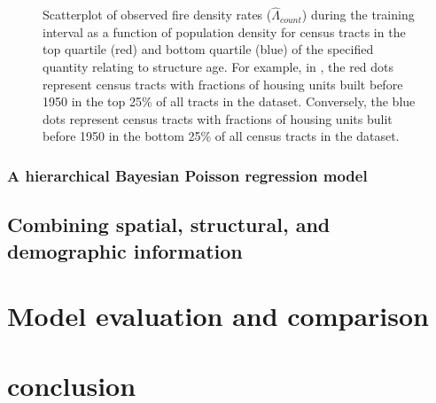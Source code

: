 \documentclass{svjour3}
\begin{document}
\begin{figure}[!htb]
\begin{center}
{          } %
      \end{center}
      \caption{Scatterplot of observed fire density rates ($\hat\Lambda_{count}$) during the training interval as a function of population density for census tracts in the top quartile (red) and bottom quartile (blue) of the specified quantity relating to structure age. For example, in \protect{}, the red dots represent census tracts with fractions of housing units built before 1950 in the top 25\% of all tracts in the dataset. Conversely, the blue dots represent census tracts with fractions of housing units bulit before 1950 in the bottom 25\% of all census tracts in the dataset.}
     \label{fig:occupancy}
  \end{figure}
  
  
  
  
  
  \subsubsection{A hierarchical Bayesian Poisson regression model}
  
  
  \subsection{Combining spatial, structural, and demographic information}
  
  \section{Model evaluation and comparison}
  
  \section{conclusion}
  
















\clearpage


\end{document}
